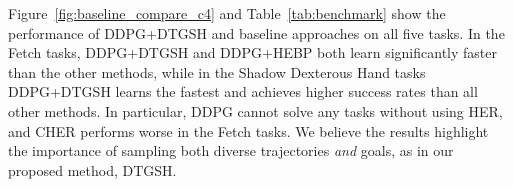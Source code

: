 Figure~\ref{fig:baseline_compare_c4} and Table~\ref{tab:benchmark} show the performance of DDPG+DTGSH and baseline approaches on all five tasks. In the Fetch tasks, DDPG+DTGSH and DDPG+HEBP both learn significantly faster than the other methods, while in the Shadow Dexterous Hand tasks DDPG+DTGSH learns the fastest and achieves higher success rates than all other methods. In particular, DDPG cannot solve any tasks without using HER, and CHER performs worse in the Fetch tasks. We believe the results highlight the importance of sampling both diverse trajectories \textit{and} goals, as in our proposed method, DTGSH.
\begin{table}[h]
    \centering
    \vspace{0.2em}
    \caption{Final mean success rate $\pm$ standard deviation, with best results in \textbf{bold}.}
    \label{tab:benchmark}
\end{table}
